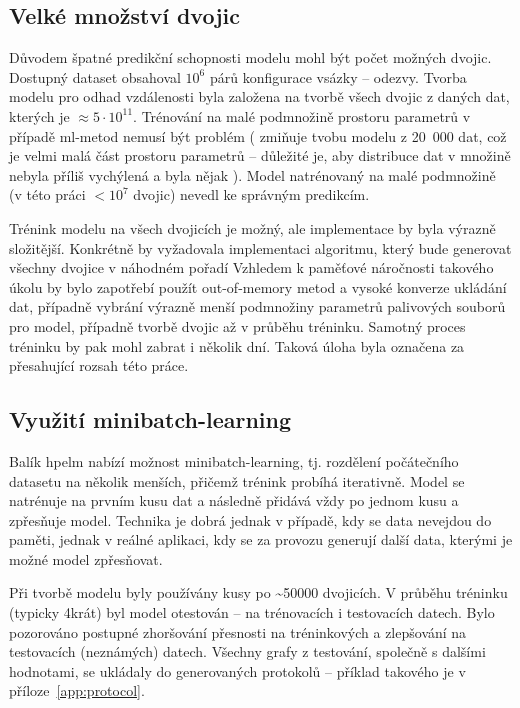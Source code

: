 \subsection{Velké množství dvojic}
Důvodem špatné predikční schopnosti modelu mohl být počet možných dvojic. Dostupný dataset obsahoval $10^6$ párů konfigurace vsázky -- odezvy. 
Tvorba modelu pro odhad vzdálenosti byla založena na tvorbě všech dvojic z daných dat, kterých je $\approx 5\cdot 10^{11}$. 
Trénování na malé podmnožině prostoru parametrů v případě \ac{ml}-metod nemusí být problém (\cite{schlunz} zmiňuje tvobu modelu z 20~000 dat, což je velmi malá část prostoru parametrů -- důležité je, aby distribuce dat v množině nebyla příliš vychýlená a byla nějak 
). 
Model 
natrénovaný na malé podmnožině (v této práci $< 10^7$ dvojic) nevedl ke správným predikcím. 

Trénink modelu na všech dvojicích je možný, ale implementace by byla výrazně složitější. Konkrétně by vyžadovala implementaci 
algoritmu, který bude generovat všechny dvojice v náhodném pořadí Vzhledem k paměťové náročnosti takového úkolu by bylo zapotřebí použít out-of-memory 
metod a vysoké konverze ukládání dat, případně vybrání výrazně menší podmnožiny parametrů palivových souborů pro model, 
případně tvorbě dvojic až v průběhu tréninku. Samotný proces tréninku by pak mohl zabrat i několik dní. Taková úloha byla 
označena za přesahující rozsah této práce. 

\subsection{Využití minibatch-learning}
Balík \ac{hpelm} nabízí možnost minibatch-learning, tj. rozdělení počátečního datasetu na několik menších, přičemž trénink probíhá 
iterativně. Model se natrénuje na prvním kusu dat a následně přidává vždy po jednom kusu a zpřesňuje model. Technika je 
dobrá jednak v případě, kdy se data nevejdou do paměti, jednak v reálné aplikaci, kdy se za provozu generují další data, kterými 
je možné model zpřesňovat.

Při tvorbě modelu byly používány kusy po \textasciitilde 50000 dvojicích. V průběhu tréninku (typicky 4krát) byl model 
otestován -- na trénovacích i testovacích datech. Bylo pozorováno postupné zhoršování přesnosti na tréninkových a zlepšování na 
testovacích (neznámých) datech. Všechny grafy z testování, společně s dalšími hodnotami, se ukládaly do generovaných 
protokolů -- příklad takového je v příloze~\ref{app:protocol}.

